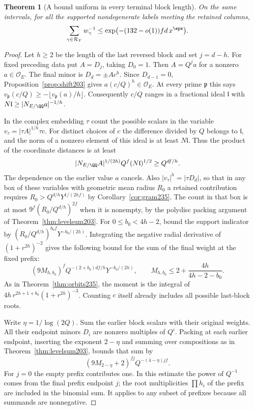\documentclass[a4paper,11pt]{article}
\newtheorem{theorem}[proposition]{Theorem}
\theoremstyle{definition}
\theoremstyle{remark}
\numberwithin{equation}{section}
\begin{document}
\begin{theorem}[A bound uniform in every terminal block length]
\leavevmode\label{thm:powers236}
On the same intervals, for all the supported nondegenerate
labels meeting the retained columns,
\[
             \sum_{\gamma\in\mathcal R_Y} w_\gamma^{-1}
                      \le \exp\bigl(-(132-o(1))fd\,x^\eps\bigr).
\]
\end{theorem}
\begin{proof}
Let \(h\ge2\) be the length of the last reversed block and set
\(j=d-h\). For fixed preceding data put \(A=D_j\), taking
\(D_0=1\). Then \(A=Q^j a\) for a nonzero
\(a\in\mathcal O_E\). The final minor is \(D_d=\pm A c^h\).
Since \(D_{d-1}=0\), Proposition~\ref{prop:shift203} gives
\(a(c/Q)^h\in\mathcal O_E\). At every prime \(\mathfrak p\)
this says \(v_{\mathfrak p}(c/Q)\ge
-\lfloor v_{\mathfrak p}(a)/h\rfloor\).
Consequently \(c/Q\) ranges in a fractional ideal \(\mathfrak l\)
with \(N\mathfrak l\ge |N_{E/\QQ}a|^{-1/h}\).

In the complex embedding \(\tau\) count the possible scalars in
the variable \(v_\tau=|\tau A|^{1/h}\tau c\). For distinct
choices of \(c\) the difference divided by \(Q\) belongs to
\(\mathfrak l\), and the norm of a nonzero element of this ideal
is at least \(N\mathfrak l\). Thus the product of the coordinate
distances is at least
\[
  |N_{E/\QQ}A|^{1/(2h)}Q^f(N\mathfrak l)^{1/2}
                  \ge Q^{df/h}.
\]
The dependence on the earlier value \(a\) cancels. Also
\(|v_\tau|^h=|\tau D_d|\), so that in any box of these variables
with geometric mean radius \(R_0\) a retained contribution
requires \(R_0>Q^{d/h}Y^{1/(2hf)}\) by
Corollary~\ref{cor:gram235}. The count in that box is at most
\(9^f(R_0/Q^{d/h})^{2f}\) when it is nonempty, by the polydisc
packing argument of Theorem~\ref{thm:levelsum203}.
For \(0\le b_0<4h-2\), bound the support indicator by
\((R_0/Q^{d/h})^{b_0 f}Y^{-b_0/(2h)}\). Integrating the
negative radial derivative of \((1+r^{2h})^{-2}\) gives the
following bound for the sum of the final weight at the fixed prefix:
\[
 (9M_{h,b_0})^f Q^{-(2+b_0)df/h}Y^{-b_0/(2h)},\qquad
 M_{h,b_0}\le 2+\frac{4h}{4h-2-b_0}.
\]
As in Theorem~\ref{thm:orbits235}, the moment is the integral
of \(4h\,r^{2h+1+b_0}(1+r^{2h})^{-3}\). Counting \(c\) itself
already includes all possible last-block roots.

Write \(\eta=1/\log(2Q)\). Sum the earlier block scalars with
their original weights. All their endpoint minors \(D_i\) are
nonzero multiples of \(Q^i\). Packing at each earlier endpoint,
inserting the exponent \(2-\eta\) and summing over compositions
as in Theorem~\ref{thm:levelsum203}, bounds that sum by
\[
       (9M_{2-\eta}+2)^{fj}Q^{-(4-\eta)jf}.
\]
For \(j=0\) the empty prefix contributes one. In this estimate
the power of \(Q^{-1}\) comes from the final prefix endpoint
\(j\); the root multiplicities \(\prod h_i\) of the prefix
are included in the binomial sum. It applies to any subset of
prefixes because all summands are nonnegative.


\end{proof}
\end{document}

